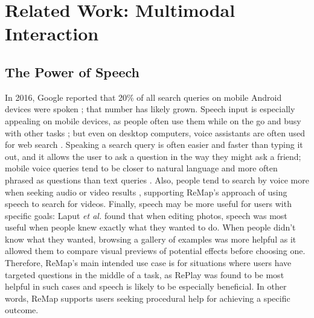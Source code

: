 \section{Related Work: Multimodal Interaction}
\subsection{The Power of Speech}
In 2016, Google reported that 20\% of all search queries on mobile Android devices were spoken \cite{Pichai2016}; that number has likely grown. Speech input is especially appealing on mobile devices, as people often use them while on the go and busy with other tasks \cite{Guy2016}; but even on desktop computers, voice assistants are often used for web search \cite{Mehrotra2016}. Speaking a search query is often easier and faster than typing it out, and it allows the user to ask a question in the way they might ask a friend; mobile voice queries tend to be closer to natural language and more often phrased as questions than text queries \cite{Guy2016}. Also, people tend to search by voice more when seeking audio or video results \cite{Guy2016}, supporting ReMap's approach of using speech to search for videos. Finally, speech may be more useful for users with specific goals: Laput \textit{et al.} \cite{Laput2013} found that when editing photos, speech was most useful when people knew exactly what they wanted to do. When people didn't know what they wanted, browsing a gallery of examples was more helpful as it allowed them to compare visual previews of potential effects before choosing one. Therefore, ReMap's main intended use case is for situations where users have targeted questions in the middle of a task, as RePlay was found to be most helpful in such cases and speech is likely to be especially beneficial. In other words, ReMap supports users seeking procedural help for achieving a specific outcome.

